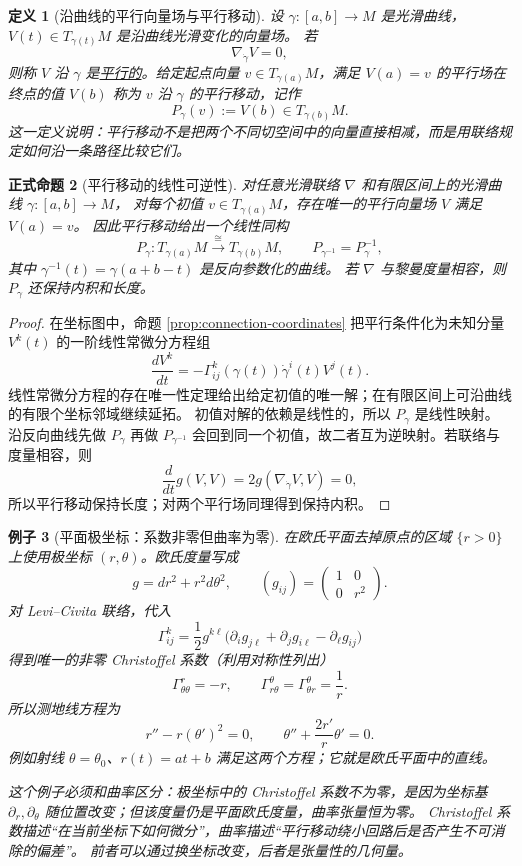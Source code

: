 \documentclass[UTF8,fontset=none,a4paper,11pt]{ctexart}
\theoremstyle{foundation-definition}
\newtheorem{definition}{定义}[section]
\theoremstyle{foundation-theorem}
\theoremstyle{foundation-proposition}
\newtheorem{proposition}[definition]{正式命题}
\theoremstyle{foundation-example}
\newtheorem{example}[definition]{例子}
\theoremstyle{foundation-remark}
\theoremstyle{foundation-theorem}
\newcommand{\term}[2]{\hyperref[#1]{#2}}
\begin{document}
\begin{definition}[沿曲线的平行向量场与平行移动]
\label{def:parallel-transport}
设 \(\gamma:[a,b]\to M\) 是光滑曲线，\(V(t)\in T_{\gamma(t)}M\) 是沿曲线光滑变化的向量场。
若
\[
\nabla_{\dot\gamma}V=0,
\]
则称 \(V\) 沿 \(\gamma\) 是\term{def:parallel-transport}{平行的}。给定起点向量
\(v\in T_{\gamma(a)}M\)，满足 \(V(a)=v\) 的平行场在终点的值 \(V(b)\) 称为
\(v\) 沿 \(\gamma\) 的平行移动，记作
\[
P_\gamma(v):=V(b)\in T_{\gamma(b)}M.
\]
这一定义说明：平行移动不是把两个不同切空间中的向量直接相减，而是用联络规定如何沿一条路径比较它们。
\end{definition}

\begin{proposition}[平行移动的线性可逆性]
\label{prop:parallel-transport}
对任意光滑联络 \(\nabla\) 和有限区间上的光滑曲线 \(\gamma:[a,b]\to M\)，
对每个初值 \(v\in T_{\gamma(a)}M\)，存在唯一的平行向量场 \(V\) 满足 \(V(a)=v\)。
因此平行移动给出一个线性同构
\[
P_\gamma:T_{\gamma(a)}M\xrightarrow{\ \cong\ }T_{\gamma(b)}M,
\qquad
P_{\gamma^{-1}}=P_\gamma^{-1},
\]
其中 \(\gamma^{-1}(t)=\gamma(a+b-t)\) 是反向参数化的曲线。
若 \(\nabla\) 与黎曼度量相容，则 \(P_\gamma\) 还保持内积和长度。
\end{proposition}

\begin{proof}
在坐标图中，命题 \ref{prop:connection-coordinates} 把平行条件化为未知分量 \(V^k(t)\) 的一阶线性常微分方程组
\[
\frac{dV^k}{dt}
=-\Gamma^k_{ij}(\gamma(t))\dot\gamma^i(t)V^j(t).
\]
线性常微分方程的存在唯一性定理给出给定初值的唯一解；在有限区间上可沿曲线的有限个坐标邻域继续延拓。
初值对解的依赖是线性的，所以 \(P_\gamma\) 是线性映射。沿反向曲线先做 \(P_\gamma\) 再做
\(P_{\gamma^{-1}}\) 会回到同一个初值，故二者互为逆映射。若联络与度量相容，则
\[
\frac{d}{dt}g(V,V)=2g(\nabla_{\dot\gamma}V,V)=0,
\]
所以平行移动保持长度；对两个平行场同理得到保持内积。
\end{proof}

\begin{example}[平面极坐标：系数非零但曲率为零]
在欧氏平面去掉原点的区域 \(\{r>0\}\) 上使用极坐标 \((r,\theta)\)。欧氏度量写成
\[
g=dr^2+r^2d\theta^2,
\qquad (g_{ij})=\begin{pmatrix}1&0\\0&r^2\end{pmatrix}.
\]
对 Levi--Civita 联络，代入
\[
\Gamma^k_{ij}
=\frac12g^{k\ell}
\bigl(\partial_i g_{j\ell}+\partial_jg_{i\ell}-\partial_\ell g_{ij}\bigr)
\]
得到唯一的非零 Christoffel 系数（利用对称性列出）
\[
\Gamma^r_{\theta\theta}=-r,
\qquad
\Gamma^\theta_{r\theta}=\Gamma^\theta_{\theta r}=\frac1r.
\]
所以测地线方程为
\[
r''-r(\theta')^2=0,
\qquad
\theta''+\frac{2r'}{r}\theta'=0.
\]
例如射线 \(\theta=\theta_0\)、\(r(t)=at+b\) 满足这两个方程；它就是欧氏平面中的直线。

这个例子必须和曲率区分：极坐标中的 Christoffel 系数不为零，是因为坐标基
\(\partial_r,\partial_\theta\) 随位置改变；但该度量仍是平面欧氏度量，曲率张量恒为零。
Christoffel 系数描述“在当前坐标下如何微分”，曲率描述“平行移动绕小回路后是否产生不可消除的偏差”。
前者可以通过换坐标改变，后者是张量性的几何量。
\end{example}
\end{document}
